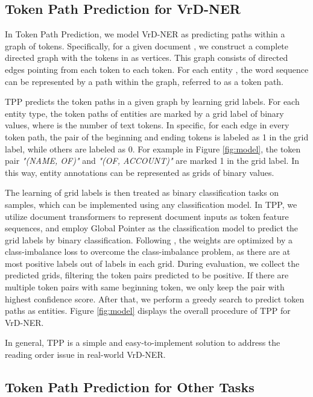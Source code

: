 \documentclass[11pt]{article}
\begin{document}
\subsection{Token Path Prediction for VrD-NER}

In Token Path Prediction, we model VrD-NER as predicting paths within a graph of tokens. 
Specifically, for a given document , we construct a complete directed graph with the  tokens  in  as vertices. This graph consists of  directed edges pointing from each token to each token. 
For each entity , the word sequence can be represented by a path  within the graph, referred to as a token path.

TPP predicts the token paths in a given graph by learning grid labels. 
For each entity type, the token paths of entities are marked by a  grid label of binary values, where  is the number of text tokens. 
In specific, for each edge in every token path, the pair of the beginning and ending tokens is labeled as 1 in the grid label, while others are labeled as 0. 
For example in Figure \ref{fig:model}, the token pair {\footnotesize \textit{"(NAME, OF)"}} and {\footnotesize \textit{"(OF, ACCOUNT)"}} are marked 1 in the grid label. 
In this way, entity annotations can be represented as  grids of  binary values. 

The learning of grid labels is then treated as  binary classification tasks on  samples, which can be implemented using any classification model. 
In TPP, we utilize document transformers to represent document inputs as token feature sequences, and employ Global Pointer \citep{su2022global} as the classification model to predict the grid labels by binary classification. Following \citep{su2022global}, the weights are optimized by a class-imbalance loss to overcome the class-imbalance problem, as there are at most  positive labels out of  labels in each grid. 
During evaluation, we collect the  predicted grids, filtering the token pairs predicted to be positive. If there are multiple token pairs with same beginning token, we only keep the pair with highest confidence score. After that, we perform a greedy search to predict token paths as entities. 
Figure \ref{fig:model} displays the overall procedure of TPP for VrD-NER. 

In general, TPP is a simple and easy-to-implement solution to address the reading order issue in real-world VrD-NER.

\subsection{Token Path Prediction for Other Tasks}
\end{document}
